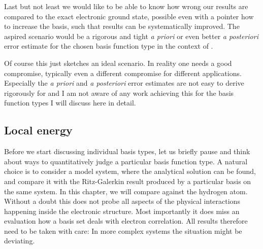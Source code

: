 Last but not least we would like to be able to know
how wrong our \HF results are compared to the exact electronic ground state,
possible even with a pointer how to increase the basis,
such that results can be systematically improved.
The aspired scenario would be a rigorous and tight
\textit{a priori} or even better \textit{a posteriori} error estimate
for the chosen basis function type in the context of \HF.

Of course this just sketches an ideal scenario.
In reality one needs a good compromise,
typically even a different compromise for different applications.
Especially the \textit{a priori} and \textit{a posteriori} error estimates
are not easy to derive rigorously for \HF
and I am not aware of any work achieving this for the basis function
types I will discuss here in detail.

\subsection{Local energy}
\label{sec:LocalEnergy}
Before we start discussing individual basis types,
let us briefly pause and think about ways to quantitatively
judge a particular basis function type.
A natural choice is to consider a model system,
where the analytical solution can be found, and compare it
with the Ritz-Galerkin \HF result produced by a particular basis on the same system.
In this chapter, we will compare against the hydrogen atom.
Without a doubt this does not probe all aspects of the physical interactions
happening inside the electronic structure.
Most importantly it does miss an evaluation how a basis set deals with electron correlation.
All results therefore need to be taken with care:
In more complex systems the situation might be deviating.

